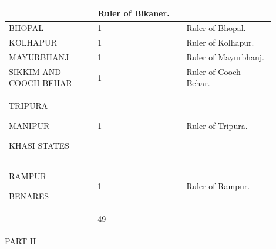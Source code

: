 \begin{longtable}{|p{0.30\linewidth}|p{0.30\linewidth}|p{0.30\linewidth}|}
 & Ruler of Bikaner.

 \\
\hline
BHOPAL

 & 1

 & Ruler of Bhopal.

 \\
\hline
KOLHAPUR

 & 1

 & Ruler of Kolhapur.

 \\
\hline
MAYURBHANJ

 & 1

 & Ruler of Mayurbhanj.

 \\
\hline
SIKKIM AND COOCH BEHAR

 & 1

 & Ruler of Cooch Behar.

 \\
\hline
TRIPURA

MANIPUR

KHASI STATES

 & 1

 & Ruler of Tripura.

 \\
\hline
RAMPUR

BENARES

 & 1

 & Ruler of Rampur.

 \\
\hline


 & 49

 & 

 \\
\hline
\end{longtable}
\medskip


\begin{center}
PART II\end{center}


